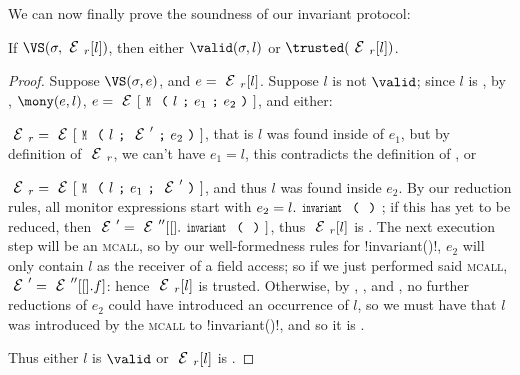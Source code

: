 \setcounter{theorem}{0}\LS
We can now finally prove the soundness of our invariant protocol:
\SS
\begin{theorem}[Soundness]\rm
If $\VS(\s, \ER[l])$, then either $\valid(\s,l)$ or $\trusted(\ER[l])$.
\end{theorem}\SS
\begin{proof}
\noindent Suppose $\VS(\s, e)$, and $e = \ER[l]$. Suppose $l$ is not $\valid$; since $l$ is \reach, by , $\mony(e,l)$, $e = \E[\M{l}{e_1}{e_2}]$, and either:
\begin{iitemize}
	\item $\ER = \E[\M{l}{\E'}{e_2}]$, that is $l$ was found inside of $e_1$, but by definition of $\ER$, we can't have $e_1 = l$, this contradicts the definition of \mony, or
	\item $\ER = \E[\M{l}{e_1}{\E'}]$, and thus $l$ was found inside $e_2$. By our reduction rules, all monitor expressions start with $e_2=l.\invariant$; if this has yet to be reduced, then $\E' = \E''[\hole.\invariant]$, thus $\ER[l]$ is \trusted. The next execution step will be an \textsc{mcall}, so by our well-formedness rules for \Q!invariant()!, $e_2$ will only contain $l$ as the receiver of a field access; so if we just performed said \textsc{mcall}, $\E' = \E''[\hole.f]$: hence $\ER[l]$ is trusted. Otherwise, by , , and \CNC, no further reductions of $e_2$ could have introduced an occurrence of $l$, so we must have that $l$ was introduced by the \textsc{mcall} to \Q!invariant()!, and so it is \trusted.
\end{iitemize}
Thus either $l$ is $\valid$ or $\ER[l]$ is \trusted.
\end{proof}
